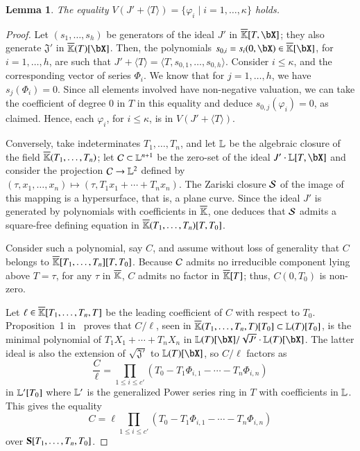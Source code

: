 \documentclass[amsthm]{elsart}
\newtheorem{lemma}[definition]{Lemma}
\begin{document}
\begin{lemma}\label{lemma:Z1}
  The equality $V(J' +\langle T \rangle)=\{\varphi_i \mid i=1,\dots,\kappa\}$ holds.
\end{lemma}
\begin{proof}
  Let $(s_1,\dots,s_h)$ be generators of the ideal $J'$ in
  $\KKbar[T,\bX]$; they also generate $\mathfrak{J}'$ in
  $\KKbar(T)[\bX]$. Then, the polynomials $s_{0,i}=s_i(0,\bX) \in
  \KKbar[\bX]$, for $i=1,\dots,h$, are such that $J'+\langle T\rangle
  = \langle T,s_{0,1},\dots,s_{0,h} \rangle$.  Consider $i \le
  \kappa$, and the corresponding vector of series $\Phi_i$. We know
  that for $j=1,\dots,h$, we have $s_j(\Phi_i)=0$.  Since all elements
  involved have non-negative valuation, we can take the coefficient of
  degree $0$ in $T$ in this equality and deduce
  $s_{0,j}(\varphi_i)=0$, as claimed. Hence, each $\varphi_i$, for $i
  \le \kappa$, is in $V(J' + \langle T \rangle)$.

  Conversely, take indeterminates $T_1,\dots,T_n$, and let $\mathbb{L}$ be
  the algebraic closure of the field $\overline{\mathbb{K}}(T_1,\dots,T_n)$; let
  ${\cal C}\subset{\LL}{}^{n+1}$ be the zero-set of the ideal $J'\cdot
  \LL[T,\bX]$ and consider the projection ${\cal C} \to {\LL}{}^2$
  defined by $(\tau,x_1,\dots,x_n)\mapsto (\tau,T_1 x_1 + \cdots + T_n
  x_n)$. The Zariski closure ${\cal S}$ of the image of this mapping
  is a hypersurface, that is, a plane curve.  Since the ideal $J'$ is generated by polynomials
  with coefficients in $\overline{\mathbb{K}}$, one deduces that ${\cal S}$ admits a square-free
  defining equation in $\overline{\mathbb{K}}(T_1,\dots,T_n)[T,T_0]$.

  Consider such a polynomial, say $C$, and assume without loss of
  generality that $C$ belongs to 
  $\overline{\mathbb{K}}[T_1,\dots,T_n][T,T_0]$. Because ${\cal C}$ admits no irreducible
  component lying above $T=\tau$, for any $\tau$ in $\overline{\mathbb{K}}$, $C$
  admits no factor in $\overline{\mathbb{K}}[T]$; thus, $C(0,T_0)$ is non-zero.

  Let $\ell \in \overline{\mathbb{K}}[T_1,\dots,T_n,T]$ be the leading coefficient of
  $C$ with respect to $T_0$. Proposition~1 in~\cite{Schost03} proves
  that $C/\ell$, seen in $\overline{\mathbb{K}}(T_1,\dots,T_n,T)[T_0] \subset
  \mathbb{L}(T)[T_0]$, is the minimal polynomial of $T_1 X_1 + \cdots +
  T_n X_n$ in $\LL(T)[\bX]/\sqrt{J'}\cdot \LL(T)[\bX]$. The latter ideal
  is also the extension of $\sqrt{\mathfrak{J}'}$ to $\LL(T)[\bX]$, 
  so $C/\ell$ factors as
  $$\frac C\ell = \prod_{1\le i \le c'}(T_0-T_1 \Phi_{i,1} - \cdots - T_n \Phi_{i,n})$$
  in $\mathbb{L}' [T_0]$ where $\mathbb{L}'$ is the generalized Power
  series ring in $T$ with coefficients in $\mathbb{L}$.  This gives the
  equality
  $$C =\ell \prod_{1\le i \le  c'}(T_0-T_1 \Phi_{i,1} - \cdots - T_n
  \Phi_{i,n})$$ over $\mathbf{S}[T_1,\dots,T_n,T_0]$. 


\end{proof}
\end{document}
